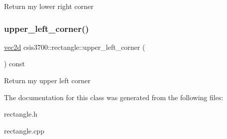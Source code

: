 Return my lower right corner \mbox{\label{classcsis3700_1_1rectangle_a8d1b0714f3e711e5aaa6b708d358b945}} 
\subsubsection{\texorpdfstring{upper\+\_\+left\+\_\+corner()}{upper\_left\_corner()}}
{\footnotesize\ttfamily \hyperlink{classcsis3700_1_1vec2d}{vec2d} csis3700\+::rectangle\+::upper\+\_\+left\+\_\+corner (\begin{DoxyParamCaption}{ }\end{DoxyParamCaption}) const}

Return my upper left corner 

The documentation for this class was generated from the following files\+:\begin{DoxyCompactItemize}
\item 
rectangle.\+h\item 
rectangle.\+cpp\end{DoxyCompactItemize}
